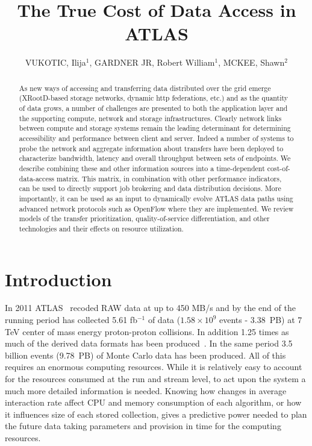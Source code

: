 \documentclass[a4paper]{jpconf}
\begin{document}
\title{The True Cost of Data Access in ATLAS}

\author{VUKOTIC, Ilija$^1$, GARDNER JR, Robert William$^1$, MCKEE, Shawn$^2$ }

\address{$^1$ University of Chicago, 5620 S Ellis Ave, Chicago IL 60637, USA}
\address{$^2$ University of Michigan, ATLAS Group}


\begin{abstract}
  As new ways of accessing and transferring data distributed over the grid emerge (XRootD-based storage networks, dynamic http federations, etc.) and as the quantity of data grows, a number of challenges are presented to both the application layer and the supporting compute, network and storage infrastructures. Clearly network links between compute and storage systems remain the leading determinant for determining accessibility and performance between client and server. Indeed a number of systems to probe the network and aggregate information about transfers have been deployed to characterize bandwidth, latency and overall throughput between sets of endpoints. We describe combining these and other information sources into a time-dependent cost-of-data-access matrix. This matrix, in combination with other performance indicators, can be used to directly support job brokering and data distribution decisions. More importantly, it can be used as an input to dynamically evolve ATLAS data paths using advanced network protocols such as OpenFlow where they are implemented. We review models of the transfer prioritization, quality-of-service differentiation, and other technologies and their effects on resource utilization.
\end{abstract}

\section{Introduction}

In 2011 ATLAS~\cite{atlas} recoded RAW data at up to 450 MB/s and by the end of the running period has collected 5.61 fb$^{-1}$ of data ($1.58\times10^{9}$ events - 3.38~PB) at 7 TeV center of mass energy proton-proton collisions. In addition 1.25 times as much of the derived data formats has been produced~\cite{boris}. In the same period 3.5 billion events (9.78~PB) of Monte Carlo data has been produced. All of this requires an enormous computing resources. While it is relatively easy to account for the resources consumed at the run and stream level, to act upon the system a much more detailed information is needed. Knowing how changes in average interaction rate affect CPU and memory consumption of each algorithm, or how it influences size of each stored collection, gives a predictive power needed to plan the future data taking parameters and provision in time for the computing resources.
\end{document}
